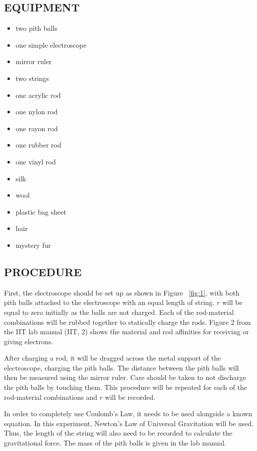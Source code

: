 \documentclass [12pt, letterpaper, twoside]{article}
\begin{document}
\subsection*{EQUIPMENT}
  \noindent
  \begin{itemize}
    \itemsep0em
    \item{two pith balls}
    \item{one simple electroscope}
    \item{mirror ruler}
    \item{two strings}
    \item{one acrylic rod}
    \item{one nylon rod}
    \item{one rayon rod}
    \item{one rubber rod}
    \item{one vinyl rod}
    \item{silk}
    \item{wool}
    \item{plastic bag sheet}
    \item{hair}
    \item{mystery fur}
  \end{itemize}

\subsection*{PROCEDURE}
First, the electroscope should be set up as shown in Figure ~\ref{fig:1}, with both pith balls attached to the electroscope with an equal length of string. \(r\) will be equal to zero initially as the balls are not charged. Each of the rod-material combinations will be rubbed together to statically charge the rods. Figure 2 from the IIT lab manual (IIT, 2) shows the material and rod affinities for receiving or giving electrons.

After charging a rod, it will be dragged across the metal support of the electroscope, charging the pith balls. The distance between the pith balls will then be measured using the mirror ruler. Care should be taken to not discharge the pith balls by touching them. This procedure will be repeated for each of the rod-material combinations and \(r\) will be recorded.

In order to completely use Coulomb's Law, it needs to be used alongside a known equation. In this experiment, Newton's Law of Universal Gravitation will be used. Thus, the length of the string will also need to be recorded to calculate the gravitational force. The mass of the pith balls is given in the lab manual.
\end{document}
